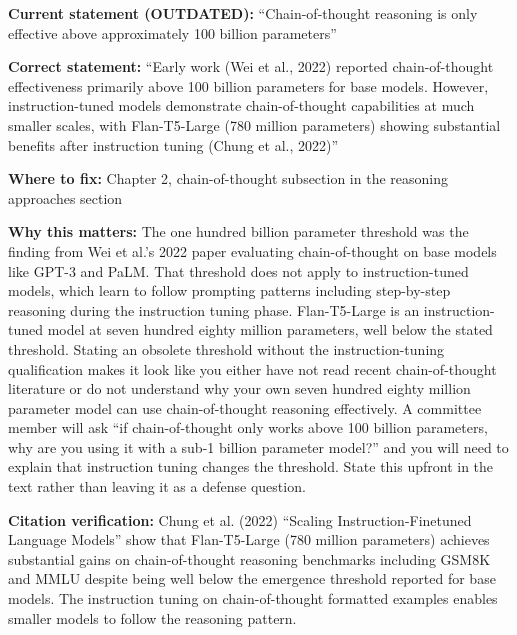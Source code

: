 \documentclass[11pt,a4paper]{article}
\newcommand{\criticalbox}[2]{%
\begin{tcolorbox}[enhanced,breakable,
  colback=LightCrimson,colframe=Crimson,boxrule=1.5pt,arc=4pt,
  left=8pt,right=8pt,top=6pt,bottom=6pt,
  title={\bfseries\small\color{white}#1},
  attach boxed title to top left={yshift=-2mm,xshift=6mm},
  boxed title style={colback=Crimson,arc=3pt,boxrule=0pt,
    left=4pt,right=4pt,top=2pt,bottom=2pt}]
#2
\end{tcolorbox}}
\begin{document}
\criticalbox{CORRECTION 4: Chain-of-Thought Emergent Ability Threshold}{
\textbf{Current statement (OUTDATED):} ``Chain-of-thought reasoning is only effective above approximately 100 billion parameters''

\textbf{Correct statement:} ``Early work (Wei et al., 2022) reported chain-of-thought effectiveness primarily above 100 billion parameters for base models. However, instruction-tuned models demonstrate chain-of-thought capabilities at much smaller scales, with Flan-T5-Large (780 million parameters) showing substantial benefits after instruction tuning (Chung et al., 2022)''

\textbf{Where to fix:} Chapter 2, chain-of-thought subsection in the reasoning approaches section

\textbf{Why this matters:} The one hundred billion parameter threshold was the finding from Wei et al.'s 2022 paper evaluating chain-of-thought on base models like GPT-3 and PaLM. That threshold does not apply to instruction-tuned models, which learn to follow prompting patterns including step-by-step reasoning during the instruction tuning phase. Flan-T5-Large is an instruction-tuned model at seven hundred eighty million parameters, well below the stated threshold. Stating an obsolete threshold without the instruction-tuning qualification makes it look like you either have not read recent chain-of-thought literature or do not understand why your own seven hundred eighty million parameter model can use chain-of-thought reasoning effectively. A committee member will ask ``if chain-of-thought only works above 100 billion parameters, why are you using it with a sub-1 billion parameter model?'' and you will need to explain that instruction tuning changes the threshold. State this upfront in the text rather than leaving it as a defense question.

\textbf{Citation verification:} Chung et al. (2022) ``Scaling Instruction-Finetuned Language Models'' show that Flan-T5-Large (780 million parameters) achieves substantial gains on chain-of-thought reasoning benchmarks including GSM8K and MMLU despite being well below the emergence threshold reported for base models. The instruction tuning on chain-of-thought formatted examples enables smaller models to follow the reasoning pattern.
}
\end{document}
